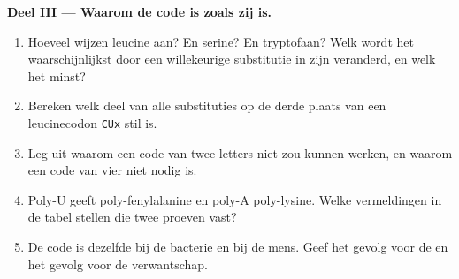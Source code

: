 \begin{problem}
\medskip
\noindent\textbf{Deel III --- Waarom de code is zoals zij is.}
\begin{enumerate}[resume]
  \item Hoeveel  wijzen leucine aan? En serine? En tryptofaan?
        Welk  wordt het waarschijnlijkst door een willekeurige
        substitutie in zijn  veranderd, en welk het minst?
  \item Bereken welk deel van alle substituties op de derde plaats van
        een leucinecodon \texttt{CUx} stil is.
  \item Leg uit waarom een code van twee letters niet zou kunnen werken,
        en waarom een code van vier niet nodig is.
  \item Poly-U geeft poly-fenylalanine en poly-A poly-lysine. Welke
        vermeldingen in de tabel stellen die twee proeven vast?
  \item De code is dezelfde bij de bacterie en bij de mens. Geef het
        gevolg voor de  en het gevolg voor de verwantschap.
\end{enumerate}


\end{problem}
